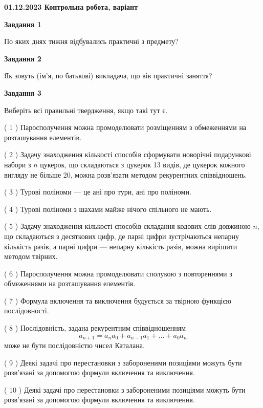 \documentclass[12pt, ukrainian]{article}
\begin{document}
\begin {large}

\textbf{01.12.2023 Контрольна робота, варіант  }\par


{
{\begin {center}\textbf{Завдання 1}\end {center}}\par
По яких днях тижня відбувались практичні з предмету?\par
{\begin {center}\textbf{Завдання 2}\end {center}}\par
Як зовуть (ім'я, по батькові) викладача, що вів практичні заняття?\par
{\begin {center}\textbf{Завдання 3}\end {center}}\par
Виберіть всі правильні твердження, якщо такі тут є.\par
\vspace{2mm}
( 1 ) Паросполучення можна промоделювати розміщенням з обмеженнями на розташування елементів.%

( 2 ) Задачу знаходження кількості способів сформувати новорічні подарункові набори з $n$ цукерок, що складаються з цукерок 13 видів, де цукерок кожного вигляду не більше 20, можна розв’язати методом рекурентних співвідношень.%

( 3 ) Турові поліноми --- це ані про тури, ані про поліноми.%

( 4 ) Турові поліноми з шахами майже нічого спільного не мають.%

( 5 ) Задачу знаходження кількості способів складання кодових слів довжиною $n$, що складаються з десяткових цифр, де парні цифри зустрічаються непарну кількість разів, а парні цифри — непарну кількість разів, можна вирішити методом твірних.%

( 6 ) Паросполучення можна промоделювати сполукою з повтореннями з обмеженнями на розташування елементів.%

( 7 ) Формула включення та виключення будується за твірною функцією послідовності.%

( 8 ) Послідовність, задана рекурентним співвідношенням $$a_{n+1}=a_{n}a_{0}+a_{n-1}a_{1}+\ldots+a_0a_{n}$$ може не бути послідовністю чисел Каталана.%

( 9 ) Деякі задачі про перестановки з забороненими позиціями можуть бути розв’я\-за\-ні за допомогою формули включення та виключення.%

( 10 ) Деякі задачі про перестановки з забороненими позиціями можуть бути розв’я\-за\-ні за допомогою формули включення та виключення.%
}
\end {large}

\vspace{4mm}
\newpage
\end{document}
